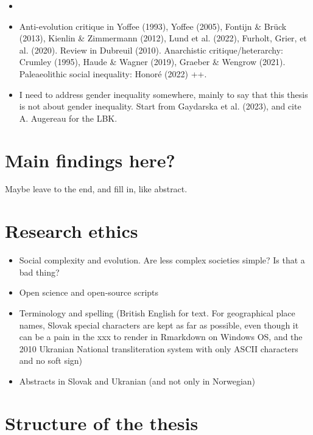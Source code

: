 \documentclass[
  12pt,
]{book}
\providecommand{\tightlist}{%
  \setlength{\itemsep}{0pt}\setlength{\parskip}{0pt}}
\begin{document}
\begin{itemize}
\tightlist
\item
\end{itemize}

\begin{itemize}
\tightlist
\item
  Anti-evolution critique in Yoffee (1993), Yoffee (2005), Fontijn \& Brück (2013), Kienlin \& Zimmermann (2012), Lund et al. (2022), Furholt, Grier, et al. (2020). Review in Dubreuil (2010). Anarchistic critique/heterarchy: Crumley (1995), Haude \& Wagner (2019), Graeber \& Wengrow (2021). Paleaeolithic social inequality: Honoré (2022) ++.
\item
  I need to address gender inequality somewhere, mainly to say that this thesis is not about gender inequality. Start from Gaydarska et al. (2023), and cite A. Augereau for the LBK.
\end{itemize}

\hypertarget{main-findings-here}{%
\section{Main findings here?}\label{main-findings-here}}

Maybe leave to the end, and fill in, like abstract.

\hypertarget{research-ethics}{%
\section{Research ethics}\label{research-ethics}}

\begin{itemize}
\item
  Social complexity and evolution. Are less complex societies simple? Is that a bad thing?
\item
  Open science and open-source scripts
\item
  Terminology and spelling (British English for text. For geographical place names, Slovak special characters are kept as far as possible, even though it can be a pain in the xxx to render in Rmarkdown on Windows OS, and the 2010 Ukranian National transliteration system with only ASCII characters and no soft sign)
\item
  Abstracts in Slovak and Ukranian (and not only in Norwegian)
\end{itemize}

\hypertarget{structure-of-the-thesis}{%
\section{Structure of the thesis}\label{structure-of-the-thesis}}
\end{document}
